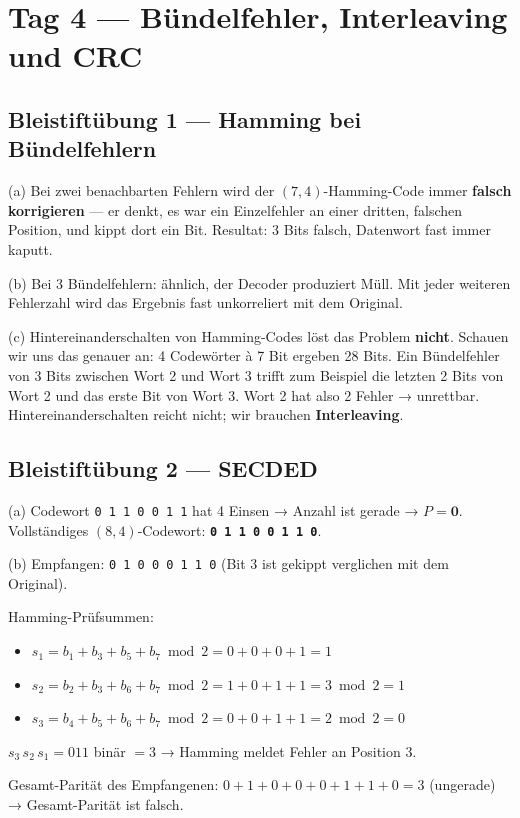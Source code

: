 \section{Tag 4 — Bündelfehler, Interleaving und CRC}

\subsection*{Bleistiftübung 1 — Hamming bei Bündelfehlern}

(a) Bei zwei benachbarten Fehlern wird der $(7,4)$-Hamming-Code immer
\textbf{falsch korrigieren} — er denkt, es war ein Einzelfehler an
einer dritten, falschen Position, und kippt dort ein Bit. Resultat:
3 Bits falsch, Datenwort fast immer kaputt.

(b) Bei 3 Bündelfehlern: ähnlich, der Decoder produziert Müll. Mit
jeder weiteren Fehlerzahl wird das Ergebnis fast unkorreliert mit dem
Original.

(c) Hintereinanderschalten von Hamming-Codes löst das Problem
\textbf{nicht}. Schauen wir uns das genauer an: 4 Codewörter à 7 Bit
ergeben 28 Bits. Ein Bündelfehler von 3 Bits zwischen Wort 2 und Wort
3 trifft zum Beispiel die letzten 2 Bits von Wort 2 und das erste Bit
von Wort 3. Wort 2 hat also 2 Fehler → unrettbar.
Hintereinanderschalten reicht nicht; wir brauchen \textbf{Interleaving}.

\subsection*{Bleistiftübung 2 — SECDED}

(a) Codewort \texttt{0 1 1 0 0 1 1} hat 4 Einsen → Anzahl ist gerade →
$P = \mathbf{0}$. Vollständiges $(8,4)$-Codewort: \textbf{\texttt{0 1
1 0 0 1 1 0}}.

(b) Empfangen: \texttt{0 1 0 0 0 1 1 0} (Bit 3 ist gekippt verglichen
mit dem Original).

Hamming-Prüfsummen:
\begin{itemize}
\item $s_1 = b_1+b_3+b_5+b_7 \bmod 2 = 0+0+0+1 = 1$
\item $s_2 = b_2+b_3+b_6+b_7 \bmod 2 = 1+0+1+1 = 3 \bmod 2 = 1$
\item $s_3 = b_4+b_5+b_6+b_7 \bmod 2 = 0+0+1+1 = 2 \bmod 2 = 0$
\end{itemize}
$s_3\, s_2\, s_1 = 011$ binär $= 3$ → Hamming meldet Fehler an Position
3.

Gesamt-Parität des Empfangenen: $0+1+0+0+0+1+1+0 = 3$ (ungerade) →
Gesamt-Parität ist falsch.

